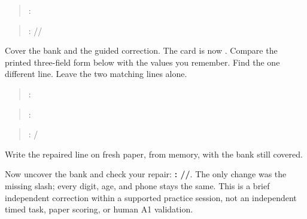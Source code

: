 \begin{quote}
:  
\end{quote}

\begin{quote}
: //
\end{quote}

\begin{tcolorbox}[breakable,colback=teal!4,colframe=teal!35!black,title={Before you move on}]
Cover the bank and the guided correction. The card is now \textbf{}. Compare the printed three-field form below with the values you remember. Find the one different line. Leave the two matching lines alone.

\begin{quote}
: 
\end{quote}

\begin{quote}
:  
\end{quote}

\begin{quote}
: /
\end{quote}

Write the repaired line on fresh paper, from memory, with the bank still covered.

Now uncover the bank and check your repair: \textbf{: //}. The only change was the missing slash; every digit, age, and phone stays the same. This is a brief independent correction within a supported practice session, not an independent timed task, paper scoring, or human A1 validation.
\end{tcolorbox}
